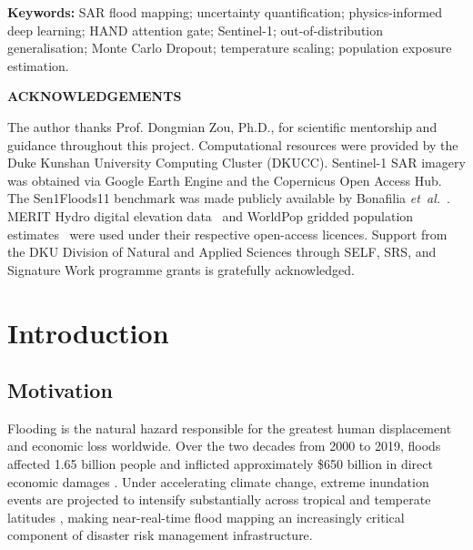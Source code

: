 \documentclass[12pt,oneside]{report}
\newcommand{\etal}{\textit{et~al.}}
\begin{document}
\vspace{0.8em}
\noindent\textbf{Keywords:} SAR flood mapping; uncertainty quantification;
physics-informed deep learning; HAND attention gate; Sentinel-1;
out-of-distribution generalisation; Monte Carlo Dropout; temperature scaling;
population exposure estimation.

\newpage
{}
{}
\begin{center}
  {\large\bfseries ACKNOWLEDGEMENTS}
\end{center}
\vspace{0.8em}

The author thanks Prof. Dongmian Zou, Ph.D., for scientific mentorship and
guidance throughout this project.
Computational resources were provided by the Duke Kunshan University
Computing Cluster (DKUCC).
Sentinel-1 SAR imagery was obtained via Google Earth Engine and the
Copernicus Open Access Hub.
The Sen1Floods11 benchmark was made publicly available by Bonafilia
\etal~\cite{bonafilia2020sen1floods11}.
MERIT Hydro digital elevation data~\cite{yamazaki2019merit} and WorldPop
gridded population estimates~\cite{stevens2015disaggregating} were used under
their respective open-access licences.
Support from the DKU Division of Natural and Applied Sciences through SELF,
SRS, and Signature Work programme grants is gratefully acknowledged.

\newpage
{}
\setcounter{page}{1}

\chapter{Introduction}

\section{Motivation}

Flooding is the natural hazard responsible for the greatest human displacement
and economic loss worldwide.
Over the two decades from 2000 to 2019, floods affected 1.65 billion people
and inflicted approximately \$650 billion in direct economic damages
\cite{undrr2020}.
Under accelerating climate change, extreme inundation events are projected to
intensify substantially across tropical and temperate latitudes
\cite{hirabayashi2013global, bloschl2019changing}, making near-real-time flood
mapping an increasingly critical component of disaster risk management
infrastructure.
\end{document}
